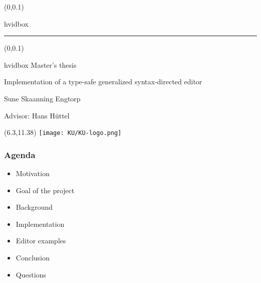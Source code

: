\documentclass[t,24pt,aspectratio=169]{beamer}
\begin{document}
{
\begin{frame}
    \begin{textblock*}{\textwidth}(0\textwidth,0.1\textheight)
        \begin{beamercolorbox}[wd=7.8cm,ht=7.3cm,sep=0.5cm]{hvidbox}
            \fontsize{5}{10}\selectfont {}
            \noindent\textcolor{KUrod}{\rule{6.8cm}{0.4pt}}
        \end{beamercolorbox}
    \end{textblock*}
    \begin{textblock*}{\textwidth}(0\textwidth,0.1\textheight)
        \begin{beamercolorbox}[wd=7.8cm,sep=0.5cm]{hvidbox}
            \Huge \textcolor{KUrod}{Master's thesis}
            \vspace{0.5cm}
            \par
            \Large Implementation of a type-safe
            generalized syntax-directed editor
            \vspace{0.5cm}
            \par
            \normalsize Sune Skaanning Engtorp
            \vspace{0.3cm}
            \par
            \footnotesize Advisor: Hans Hüttel
        \end{beamercolorbox}
    \end{textblock*}
    \begin{textblock}{1}(6.3,11.38)
        \texttt{[image: KU/KU-logo.png]}
    \end{textblock}
\end{frame}
}

\begin{frame}[hvid]
    \frametitle{Agenda}

    \begin{itemize}
        \item Motivation
        \item Goal of the project
        \item Background
        \item Implementation
        \item Editor examples
        \item Conclusion
        \item Questions
    \end{itemize}
\end{frame}
\end{document}
